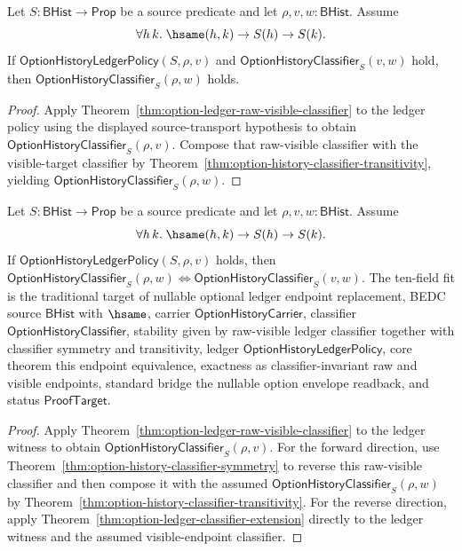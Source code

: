 \begin{theorem}
\label{thm:option-ledger-classifier-extension}
Let $S:\mathsf{BHist}\to\mathsf{Prop}$ be a source predicate and let
$\rho,v,w:\mathsf{BHist}$. Assume
$$
  \forall h\,k.\;\hsame(h,k)\to S(h)\to S(k).
$$
If $\mathsf{OptionHistoryLedgerPolicy}(S,\rho,v)$ and
$\mathsf{OptionHistoryClassifier}_S(v,w)$ hold, then
$\mathsf{OptionHistoryClassifier}_S(\rho,w)$ holds.
\end{theorem}
\begin{proof}
Apply Theorem~\ref{thm:option-ledger-raw-visible-classifier} to the ledger
policy using the displayed source-transport hypothesis to obtain
$\mathsf{OptionHistoryClassifier}_S(\rho,v)$. Compose that raw-visible classifier
with the visible-target classifier by Theorem~\ref{thm:option-history-classifier-transitivity},
yielding $\mathsf{OptionHistoryClassifier}_S(\rho,w)$.
\end{proof}

\begin{theorem}
\label{thm:option-ledger-classifier-endpoint-equivalence}
Let $S:\mathsf{BHist}\to\mathsf{Prop}$ be a source predicate and let
$\rho,v,w:\mathsf{BHist}$. Assume
$$
  \forall h\,k.\;\hsame(h,k)\to S(h)\to S(k).
$$
If $\mathsf{OptionHistoryLedgerPolicy}(S,\rho,v)$ holds, then
$\mathsf{OptionHistoryClassifier}_S(\rho,w) \Longleftrightarrow
\mathsf{OptionHistoryClassifier}_S(v,w)$. The ten-field fit is the
traditional target of nullable optional ledger endpoint replacement, BEDC
source $\mathsf{BHist}$ with $\hsame$, carrier $\mathsf{OptionHistoryCarrier}$,
classifier $\mathsf{OptionHistoryClassifier}$, stability given by raw-visible
ledger classifier together with classifier symmetry and transitivity, ledger
$\mathsf{OptionHistoryLedgerPolicy}$, core theorem this endpoint equivalence,
exactness as classifier-invariant raw and visible endpoints, standard bridge
the nullable option envelope readback, and status $\mathsf{ProofTarget}$.
\end{theorem}
\begin{proof}
Apply Theorem~\ref{thm:option-ledger-raw-visible-classifier} to the ledger
witness to obtain $\mathsf{OptionHistoryClassifier}_S(\rho,v)$. For the forward
direction, use Theorem~\ref{thm:option-history-classifier-symmetry} to reverse
this raw-visible classifier and then compose it with the assumed
$\mathsf{OptionHistoryClassifier}_S(\rho,w)$ by
Theorem~\ref{thm:option-history-classifier-transitivity}. For the reverse
direction, apply Theorem~\ref{thm:option-ledger-classifier-extension} directly
to the ledger witness and the assumed visible-endpoint classifier.
\end{proof}

